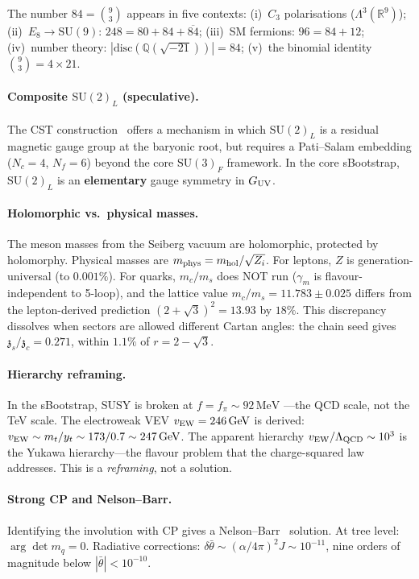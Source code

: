 \documentclass[12pt,a4paper]{article}
\newcommand{\SU}{\mathrm{SU}}
\newcommand{\Nf}{N_{\!f}}
\newcommand{\Nc}{N_{\!c}}
\newcommand{\MeV}{\,\mathrm{MeV}}
\newcommand{\GeV}{\,\mathrm{GeV}}
\newcommand{\zch}{\mathfrak{z}}
\begin{document}
The number $84 = \binom{9}{3}$ appears in five contexts:
(i)~$C_3$ polarisations ($\Lambda^3(\mathbb{R}^9)$);
(ii)~$E_8 \to \SU(9)$: $248 = 80 + 84 + \overline{84}$;
(iii)~SM fermions: $96 = 84 + 12$;
(iv)~number theory: $|\text{disc}(\mathbb{Q}(\sqrt{-21}))| = 84$;
(v)~the binomial identity $\binom{9}{3} = 4 \times 21$.

\paragraph{Composite $\SU(2)_L$ (speculative).}
The CST construction~\cite{Csaki:2011xn} offers a mechanism in
which $\SU(2)_L$ is a residual magnetic gauge group at the
baryonic root, but requires a Pati--Salam embedding
($\Nc = 4$, $\Nf = 6$) beyond the core $\SU(3)_F$ framework.
In the core sBootstrap, $\SU(2)_L$ is an
\textbf{elementary} gauge symmetry in $G_{\rm UV}$.

\paragraph{Holomorphic vs.\ physical masses.}
The meson masses from the Seiberg vacuum are holomorphic,
protected by holomorphy.
Physical masses are $m_{\rm phys} = m_{\rm hol}/\sqrt{Z_i}$.
For leptons, $Z$ is generation-universal (to $0.001\%$).
For quarks, $m_c/m_s$ does NOT run ($\gamma_m$ is
flavour-independent to 5-loop), and the lattice value
$m_c/m_s = 11.783 \pm 0.025$ differs from the lepton-derived
prediction $(2+\sqrt{3})^2 = 13.93$ by $18\%$.
This discrepancy dissolves when sectors are allowed different
Cartan angles: the chain seed gives
$\zch_s/\zch_c = 0.271$, within $1.1\%$ of $r = 2 - \sqrt{3}$.

\paragraph{Hierarchy reframing.}
In the sBootstrap, SUSY is broken at $f = f_\pi \sim 92\MeV$
---the QCD scale, not the TeV scale.
The electroweak VEV $v_{\rm EW} = 246\GeV$ is derived:
$v_{\rm EW} \sim m_t / y_t \sim 173/0.7 \sim 247\GeV$.
The apparent hierarchy $v_{\rm EW}/\Lambda_{\rm QCD} \sim 10^3$
is the Yukawa hierarchy---the flavour problem that the
charge-squared law addresses.
This is a \emph{reframing}, not a solution.

\paragraph{Strong CP and Nelson--Barr.}
Identifying the involution with CP gives a
Nelson--Barr~\cite{Nelson:1984,Barr:1984} solution.
At tree level: $\arg\det m_q = 0$.
Radiative corrections:
$\delta\bar\theta \sim (\alpha/4\pi)^2 J \sim 10^{-11}$,
nine orders of magnitude below $|\bar\theta| < 10^{-10}$.
\end{document}
